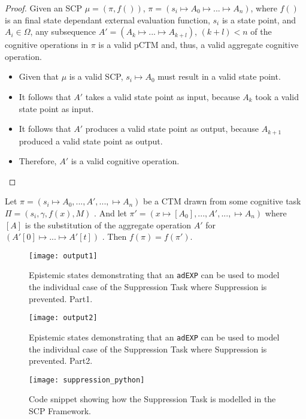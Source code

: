 \begin{proof} \label{proof:aggregateValid}
Given an SCP $\mu=(\pi,f())$, $\pi= (s_i \longmapsto A_0 \longmapsto ... \longmapsto A_n)$, where $f()$ is an final state dependant external evaluation function, $s_i$ is a state point, and $A_i \in \Omega$, any subsequence $A'=(A_k \longmapsto ... \longmapsto A_{k+l})$, $(k+l)<n$ of the cognitive operations in $\pi$ is a valid pCTM and, thus, a valid aggregate cognitive operation.
\begin{itemize}
\item Given that $\mu$ is a valid SCP, $s_i \longmapsto A_0$ must result in a valid state point.
\item It follows that $A'$ takes a valid state point as input, because $A_k$ took a valid state point as input.
\item It follows that $A'$ produces a valid state point as output, because $A_{k+1}$ produced a valid state point as output.
\item Therefore, $A'$ is a valid cognitive operation.
\end{itemize}
\end{proof}

\begin{lemma} \label{lemma:substitutionValid}
Let $\pi=(s_i\longmapsto A_0, ..., A', ..., \longmapsto A_n)$ be a CTM drawn from some cognitive task $\Pi=(s_i, \gamma, f(x), M)$ . And let $\pi'=(x\longmapsto [A_0], ..., A', ..., \longmapsto A_n)$ where $[A]$ is the substitution of the aggregate operation $A'$ for $(A'[0]\longmapsto ... \longmapsto A'[t])$ . Then $f(\pi)=f(\pi')$.
\end{lemma}



\begin{figure}
\centering \texttt{[image: output1]}
\caption{Epistemic states demonstrating that an \texttt{adEXP} can be used to model the individual case of the Suppression Task where Suppression is prevented. Part1.}
\label{fig:suppression_python}
\end{figure}
\begin{figure}
\centering \texttt{[image: output2]}
\caption{Epistemic states demonstrating that an \texttt{adEXP} can be used to model the individual case of the Suppression Task where Suppression is prevented. Part2.}
\label{fig:suppression_python2}
\end{figure}

\begin{figure}
\centering \texttt{[image: suppression\_python]}
\caption{Code snippet showing how the Suppression Task is modelled in the SCP Framework.}
\label{fig:sup_snippet}
\end{figure}

